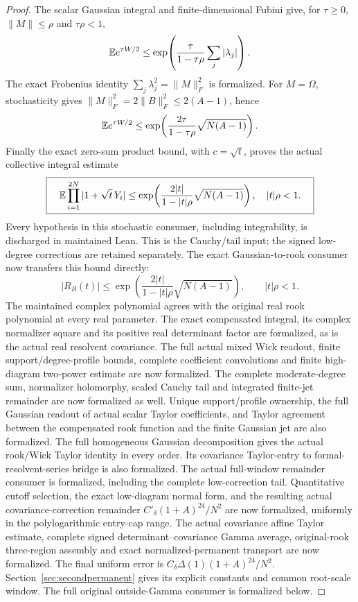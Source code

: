 \begin{proof}
The scalar Gaussian integral and finite-dimensional Fubini give, for
\(\tau\geq0\), \(\|M\|\leq\rho\) and \(\tau\rho<1\),
\[
 \mathbb E e^{\tau W/2}
 \leq\exp\!\left(\frac{\tau}{1-\tau\rho}\sum_j|\lambda_j|\right).
\]
The exact Frobenius identity
\(\sum_j\lambda_j^2=\|M\|_F^2\) is formalized.
For \(M=\Omega\), stochasticity gives
\(\|M\|_F^2=2\|B\|_F^2\leq2(A-1)\), hence
\[
 \mathbb E e^{\tau W/2}
 \leq\exp\!\left(\frac{2\tau}{1-\tau\rho}
                                      \sqrt{N(A-1)}\right).
\]
Finally the exact zero-sum product bound, with \(c=\sqrt t\),
proves the actual collective integral estimate
\[
 \boxed{\quad
 \mathbb E\prod_{i=1}^{2N}|1+\sqrt t\,Y_i|
 \leq\exp\!\left(\frac{2|t|}{1-|t|\rho}
                                     \sqrt{N(A-1)}\right),
 \quad |t|\rho<1.\quad}
\]
Every hypothesis in this stochastic consumer, including integrability,
is discharged in maintained Lean. This is the Cauchy/tail input;
the signed low-degree corrections are retained separately.
The exact Gaussian-to-rook consumer now transfers this bound directly:
\[
 \boxed{\quad |R_B(t)|\leq
 \exp\!\left(\frac{2|t|}{1-|t|\rho}\sqrt{N(A-1)}\right),
 \qquad |t|\rho<1.\quad}
\]
The maintained complex polynomial agrees with the original real rook
polynomial at every real parameter. The exact compensated integral,
its complex normalizer square and its positive real determinant factor
are formalized, as is the actual real resolvent covariance.
The full actual mixed Wick readout, finite support/degree-profile
bounds, complete coefficient convolutions and finite high-diagram
two-power estimate are now formalized. The complete moderate-degree sum,
normalizer holomorphy, scaled Cauchy tail and integrated finite-jet remainder
are now formalized as well. Unique support/profile ownership, the full
Gaussian readout of actual scalar Taylor coefficients, and Taylor agreement
between the compensated rook function and the finite Gaussian jet are also
formalized. The full homogeneous Gaussian decomposition gives the
actual rook/Wick Taylor identity in every order. Its covariance Taylor-entry
to formal-resolvent-series bridge is also formalized. The actual full-window
remainder consumer is formalized, including the complete low-correction
tail. Quantitative cutoff selection, the exact low-diagram normal form,
and the resulting actual covariance-correction remainder
\(C'_\delta(1+A)^{24}/N^2\) are now formalized, uniformly in the
polylogarithmic entry-cap range. The actual covariance affine Taylor estimate, complete
signed determinant--covariance Gamma average, original-rook three-region
assembly and exact normalized-permanent transport are now formalized.
The final uniform error is \(C_\delta\Delta(1)(1+A)^{24}/N^2\).
Section~\ref{sec:secondpermanent} gives its explicit constants and common
root-scale window. The full original outside-Gamma consumer is formalized
below.


\end{proof}
